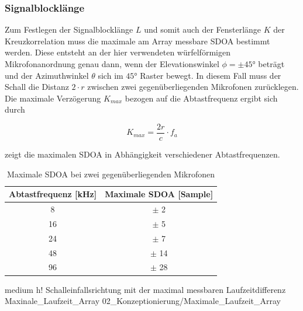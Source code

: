 \subsubsection{Signalblocklänge}
\label{subsubsec:Signalblocklaenge}
Zum Festlegen der Signalblocklänge $L$ und somit auch der Fensterlänge $K$ der Kreuzkorrelation muss die maximale am Array messbare SDOA bestimmt werden. Diese entsteht an der hier verwendeten würfelförmigen Mikrofonanordnung genau dann, wenn der Elevationswinkel $\phi=\pm45°$ beträgt und der Azimuthwinkel $\theta$ sich im $45°$ Raster bewegt. In diesem Fall muss der Schall die Distanz $2 \cdot r$ zwischen zwei gegenüberliegenden Mikrofonen zurücklegen. Die maximale Verzögerung $K_{max}$ bezogen auf die Abtastfrequenz ergibt sich durch

\begin{equation}
    K_{max} = \frac{2r}{c} \cdot f_a
\end{equation}

 zeigt die maximalen SDOA in Abhängigkeit verschiedener Abtastfrequenzen. 

\begin{table}[h]
     \center
     \begin{tabular}{cc}
     \hline
          Abtastfrequenz [kHz] & Maximale SDOA [Sample] \\
           \hline \hline
          8                    & $\pm$ 2      \\
          16                   & $\pm$ 5      \\
          24                   & $\pm$ 7      \\
          48                   & $\pm$ 14       \\
          96                   & $\pm$ 28       \\
         \hline
     \end{tabular}
  \caption{Maximale SDOA bei zwei gegenüberliegenden Mikrofonen}
 \label{tab:Maximale_SDOA}
 \end{table}




         {medium}                 %
         {h!}             %
         {Schalleinfallsrichtung mit der maximal messbaren Laufzeitdifferenz}                %
         {Maxinale_Laufzeit_Array}                %
         {02_Konzeptionierung/Maximale_Laufzeit_Array}     %



